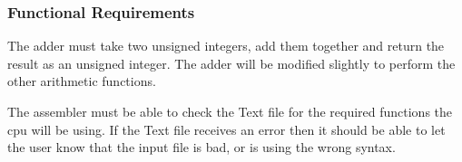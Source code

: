 \documentclass[12pt]{article}
\begin{document}
\subsubsection{Functional Requirements}
The adder must take two unsigned integers, add them together and return the result as an unsigned integer. The adder will be modified slightly to perform the other arithmetic functions.

The assembler must be able to check the Text file for the required functions the cpu will be using. If the Text file receives an error then it should be able to let the user know that the input file is bad, or is using the wrong syntax. 
\end{document}
